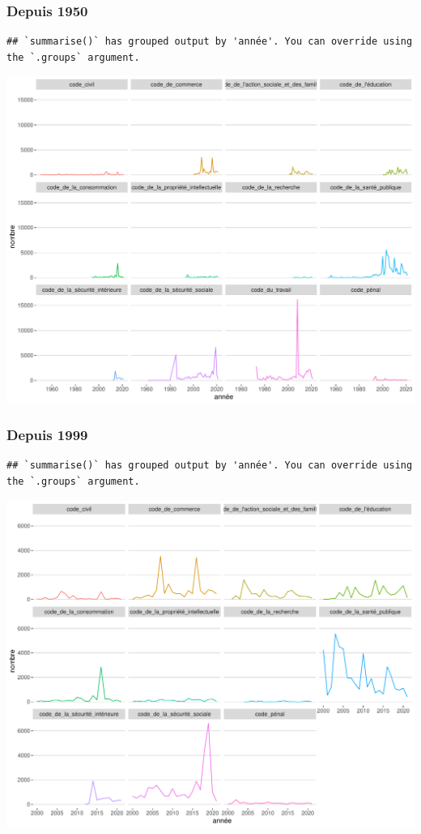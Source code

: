 \documentclass[
  oneside]{book}
\begin{document}
\hypertarget{depuis-1950-1}{%
\subsubsection{Depuis 1950}\label{depuis-1950-1}}

\begin{verbatim}
## `summarise()` has grouped output by 'année'. You can override using the `.groups` argument.
\end{verbatim}

\includegraphics{05-images_files/figure-latex/unnamed-chunk-1-1.pdf}

\hypertarget{depuis-1999}{%
\subsubsection{Depuis 1999}\label{depuis-1999}}

\begin{verbatim}
## `summarise()` has grouped output by 'année'. You can override using the `.groups` argument.
\end{verbatim}

\includegraphics{05-images_files/figure-latex/unnamed-chunk-2-1.pdf}
\end{document}
